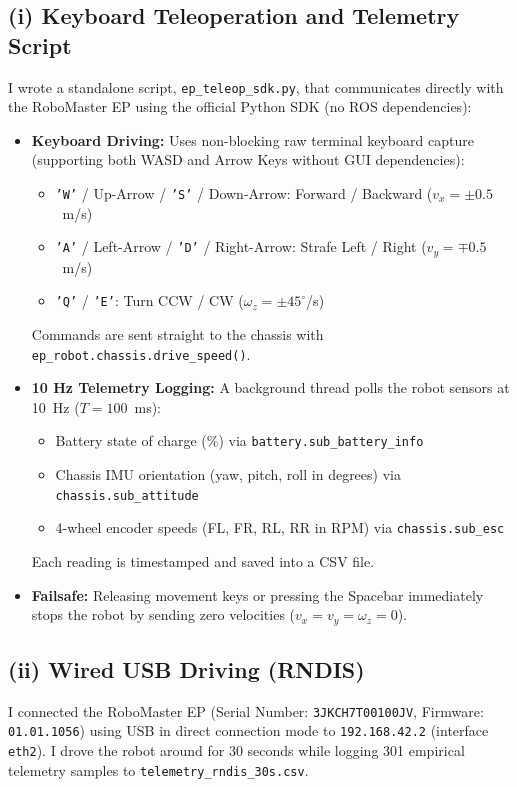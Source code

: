 \documentclass[11pt,a4paper]{article}
\begin{document}
\subsection*{(i) Keyboard Teleoperation and Telemetry Script}
I wrote a standalone script, \texttt{ep\_teleop\_sdk.py}, that communicates directly with the RoboMaster EP using the official Python SDK (no ROS dependencies):
\begin{itemize}[noitemsep,topsep=2pt]
    \item \textbf{Keyboard Driving:} Uses non-blocking raw terminal keyboard capture (supporting both WASD and Arrow Keys without GUI dependencies):
    \begin{itemize}[noitemsep,topsep=1pt]
        \item \texttt{'W'} / Up-Arrow / \texttt{'S'} / Down-Arrow: Forward / Backward ($v_x = \pm 0.5$~m/s)
        \item \texttt{'A'} / Left-Arrow / \texttt{'D'} / Right-Arrow: Strafe Left / Right ($v_y = \mp 0.5$~m/s)
        \item \texttt{'Q'} / \texttt{'E'}: Turn CCW / CW ($\omega_z = \pm 45^\circ$/s)
    \end{itemize}
    Commands are sent straight to the chassis with \texttt{ep\_robot.chassis.drive\_speed()}.
    \item \textbf{10 Hz Telemetry Logging:} A background thread polls the robot sensors at 10~Hz ($T = 100$~ms):
    \begin{itemize}[noitemsep,topsep=1pt]
        \item Battery state of charge (\%) via \texttt{battery.sub\_battery\_info}
        \item Chassis IMU orientation (yaw, pitch, roll in degrees) via \texttt{chassis.sub\_attitude}
        \item 4-wheel encoder speeds (FL, FR, RL, RR in RPM) via \texttt{chassis.sub\_esc}
    \end{itemize}
    Each reading is timestamped and saved into a CSV file.
    \item \textbf{Failsafe:} Releasing movement keys or pressing the Spacebar immediately stops the robot by sending zero velocities ($v_x = v_y = \omega_z = 0$).
\end{itemize}

\subsection*{(ii) Wired USB Driving (RNDIS)}
I connected the RoboMaster EP (Serial Number: \texttt{3JKCH7T00100JV}, Firmware: \texttt{01.01.1056}) using USB in direct connection mode to \texttt{192.168.42.2} (interface \texttt{eth2}). I drove the robot around for 30 seconds while logging 301 empirical telemetry samples to \texttt{telemetry\_rndis\_30s.csv}.
\end{document}
